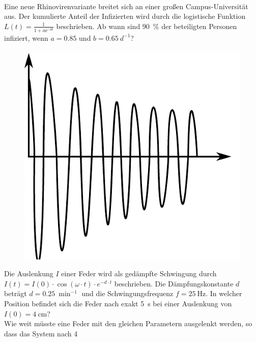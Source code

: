 \documentclass[paper=A4, pagesize, DIV=calc, smallheadings,
fontsize=12pt, expansion=false]{scrreprt}
\begin{document}
\paragraph{}
Eine neue Rhinovirenvariante breitet sich an einer großen Campus-Universität aus. Der kumulierte Anteil der 
Infizierten
wird durch die logistische Funktion 
$L(t) = \frac{1}{1 + a \text{e}^{-bt}}$ beschrieben. 
Ab wann sind \SI{90}{\percent} der beteiligten Personen infiziert, wenn $a = 0.85$ und $b = \SI{0.65}{d^{-1}}$?

\paragraph{}
\label{subsec:DampedOsz}
\begin{figure}
  \centering
  \includegraphics[width=\linewidth]{./imgs/dampedOsz.pdf}
\end{figure}
Die Auslenkung $I$ einer Feder wird als gedämpfte Schwingung durch
$I(t) = I(0) \cdot \cos(\omega \cdot t) \cdot e^{-d\cdot t}$ beschrieben.
Die Dämpfungskonstante $d$ beträgt $d = \SI{0.25}{\min^{-1}}$ und die Schwingungsfrequenz $f = \SI{25}{\text{Hz}}$.
In welcher Position befindet sich die Feder nach exakt \SI{5}{\s}  bei einer Auslenkung von
$I(0) = \SI{4}{\cm}$?\\
Wie weit müsste eine Feder mit den gleichen Parametern ausgelenkt werden, so dass das System nach \SI{4}{\min}
\end{document}
